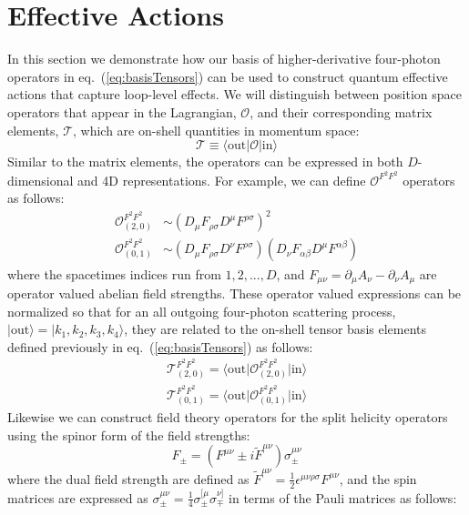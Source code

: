 \documentclass[11pt,letter]{article}
\def\eqn#1{eq.~(\ref{#1})}
\begin{document}
\section{Effective Actions} \label{sec:Actions}
In this section we demonstrate how our basis of higher-derivative four-photon operators in \eqn{eq:basisTensors} can be used to construct quantum effective actions that capture loop-level effects. We will distinguish between position space operators that appear in the Lagrangian, $\mathcal{O}$, and their corresponding matrix elements, $\mathcal{T}$, which are on-shell quantities in momentum space:
\begin{equation}\label{eq:OpsVsTens}
\mathcal{T} \equiv \langle \text{out}| \mathcal{O}|\text{in}\rangle
\end{equation}
Similar to the matrix elements, the operators can be expressed in both $D$-dimensional and 4D representations. For example, we can define $\mathcal{O}^{F^2F^2}$ operators as follows:
\begin{align}
\mathcal{O}^{F^2F^2}_{(2,0)} &\sim (D_\mu F_{\rho\sigma}D^\mu F^{\rho\sigma})^2
\\
\mathcal{O}^{F^2F^2}_{(0,1)} &\sim (D_\mu F_{\rho\sigma}D^\nu F^{\rho\sigma})(D_\nu F_{\alpha\beta}D^\mu F^{\alpha\beta})
\end{align}
where the spacetimes indices run from $1,2,...,D$, and $F_{\mu\nu} = \partial_\mu A_\nu - \partial_\nu A_\mu$ are operator valued abelian field strengths. These operator valued expressions can be normalized so that for an all outgoing four-photon scattering process, $|\text{out}\rangle = |k_1,k_2,k_3,k_4\rangle$, they are related to the on-shell tensor basis elements defined previously in \eqn{eq:basisTensors} as follows:
\begin{align}
\mathcal{T}^{F^2F^2}_{(2,0)} =\langle \text{out}\big|\mathcal{O}^{F^2F^2}_{(2,0)} \big|\text{in}\rangle
\\
\mathcal{T}^{F^2F^2}_{(0,1)} =\langle \text{out} \big|\mathcal{O}^{F^2F^2}_{(0,1)}\big |\text{in}\rangle
\end{align}
Likewise we can construct field theory operators for the split helicity operators using the spinor form of the field strengths:
\begin{equation}
F_\pm = (F^{\mu\nu} \pm i \tilde{F}^{\mu\nu})\sigma^{\mu\nu}_\pm
\end{equation}
where the dual field strength are defined as $\tilde{F}^{\mu\nu}= \frac{1}{2}\epsilon^{\mu\nu\rho\sigma}F^{\mu\nu}$, and the spin matrices are expressed as $\sigma^{\mu\nu}_\pm = \frac{1}{4} \sigma^{[\mu}_\pm \sigma^{\nu]}_\mp$ in terms of the Pauli matrices as follows:
\end{document}
